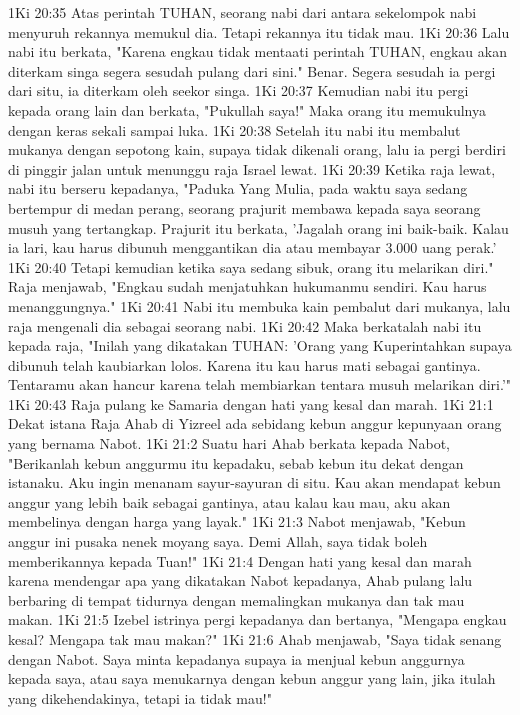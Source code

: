 1Ki 20:35  Atas perintah TUHAN, seorang nabi dari antara sekelompok nabi menyuruh rekannya memukul dia. Tetapi rekannya itu tidak mau.
1Ki 20:36  Lalu nabi itu berkata, "Karena engkau tidak mentaati perintah TUHAN, engkau akan diterkam singa segera sesudah pulang dari sini." Benar. Segera sesudah ia pergi dari situ, ia diterkam oleh seekor singa.
1Ki 20:37  Kemudian nabi itu pergi kepada orang lain dan berkata, "Pukullah saya!" Maka orang itu memukulnya dengan keras sekali sampai luka.
1Ki 20:38  Setelah itu nabi itu membalut mukanya dengan sepotong kain, supaya tidak dikenali orang, lalu ia pergi berdiri di pinggir jalan untuk menunggu raja Israel lewat.
1Ki 20:39  Ketika raja lewat, nabi itu berseru kepadanya, "Paduka Yang Mulia, pada waktu saya sedang bertempur di medan perang, seorang prajurit membawa kepada saya seorang musuh yang tertangkap. Prajurit itu berkata, 'Jagalah orang ini baik-baik. Kalau ia lari, kau harus dibunuh menggantikan dia atau membayar 3.000 uang perak.'
1Ki 20:40  Tetapi kemudian ketika saya sedang sibuk, orang itu melarikan diri." Raja menjawab, "Engkau sudah menjatuhkan hukumanmu sendiri. Kau harus menanggungnya."
1Ki 20:41  Nabi itu membuka kain pembalut dari mukanya, lalu raja mengenali dia sebagai seorang nabi.
1Ki 20:42  Maka berkatalah nabi itu kepada raja, "Inilah yang dikatakan TUHAN: 'Orang yang Kuperintahkan supaya dibunuh telah kaubiarkan lolos. Karena itu kau harus mati sebagai gantinya. Tentaramu akan hancur karena telah membiarkan tentara musuh melarikan diri.'"
1Ki 20:43  Raja pulang ke Samaria dengan hati yang kesal dan marah.
1Ki 21:1  Dekat istana Raja Ahab di Yizreel ada sebidang kebun anggur kepunyaan orang yang bernama Nabot.
1Ki 21:2  Suatu hari Ahab berkata kepada Nabot, "Berikanlah kebun anggurmu itu kepadaku, sebab kebun itu dekat dengan istanaku. Aku ingin menanam sayur-sayuran di situ. Kau akan mendapat kebun anggur yang lebih baik sebagai gantinya, atau kalau kau mau, aku akan membelinya dengan harga yang layak."
1Ki 21:3  Nabot menjawab, "Kebun anggur ini pusaka nenek moyang saya. Demi Allah, saya tidak boleh memberikannya kepada Tuan!"
1Ki 21:4  Dengan hati yang kesal dan marah karena mendengar apa yang dikatakan Nabot kepadanya, Ahab pulang lalu berbaring di tempat tidurnya dengan memalingkan mukanya dan tak mau makan.
1Ki 21:5  Izebel istrinya pergi kepadanya dan bertanya, "Mengapa engkau kesal? Mengapa tak mau makan?"
1Ki 21:6  Ahab menjawab, "Saya tidak senang dengan Nabot. Saya minta kepadanya supaya ia menjual kebun anggurnya kepada saya, atau saya menukarnya dengan kebun anggur yang lain, jika itulah yang dikehendakinya, tetapi ia tidak mau!"
